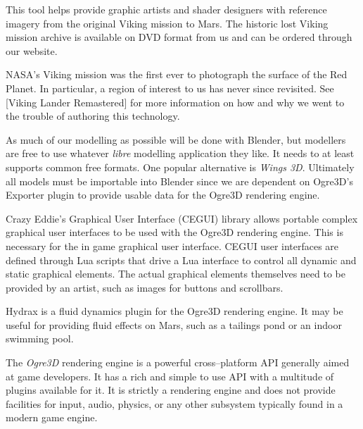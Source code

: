 

\startitemize[4]


This tool helps provide graphic artists and shader designers with reference imagery from the original Viking mission to Mars. The historic lost Viking mission archive is available on DVD format from us and can be ordered through our website. 

NASA's Viking mission was the first ever to photograph the surface of the Red Planet. In particular, a region of interest to us has never since revisited. See [Viking Lander Remastered] for more information on how and why we went to the trouble of authoring this technology.


As much of our modelling as possible will be done with Blender, but modellers are free to use whatever {\it libre} modelling application they like. It needs to at least supports common free formats. One popular alternative is {\it Wings 3D}. Ultimately all models must be importable into Blender since we are dependent on Ogre3D's Exporter plugin to provide usable data for the Ogre3D rendering engine.


Crazy Eddie's Graphical User Interface (CEGUI) library allows portable complex graphical user interfaces to be used with the Ogre3D rendering engine. This is necessary for the in game graphical user interface. CEGUI user interfaces are defined through Lua scripts that drive a Lua interface to control all dynamic and static graphical elements. The actual graphical elements themselves need to be provided by an artist, such as images for buttons and scrollbars.


Hydrax is a fluid dynamics plugin for the Ogre3D rendering engine. It may be useful for providing fluid effects on Mars, such as a tailings pond or an indoor swimming pool.


The {\it Ogre3D} rendering engine is a powerful cross--platform API generally aimed at game developers. It has a rich and simple to use API with a multitude of plugins available for it. It is strictly a rendering engine and does not provide facilities for input, audio, physics, or any other subsystem typically found in a modern game engine.

